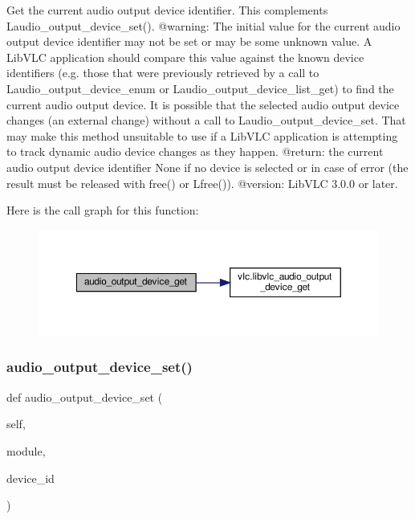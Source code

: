 \begin{DoxyVerb}Get the current audio output device identifier.
This complements L{audio_output_device_set}().
@warning: The initial value for the current audio output device identifier
may not be set or may be some unknown value. A LibVLC application should
compare this value against the known device identifiers (e.g. those that
were previously retrieved by a call to L{audio_output_device_enum} or
L{audio_output_device_list_get}) to find the current audio output device.
It is possible that the selected audio output device changes (an external
change) without a call to L{audio_output_device_set}. That may make this
method unsuitable to use if a LibVLC application is attempting to track
dynamic audio device changes as they happen.
@return: the current audio output device identifier None if no device is selected or in case of error (the result must be released with free() or L{free}()).
@version: LibVLC 3.0.0 or later.
\end{DoxyVerb}
 Here is the call graph for this function\+:
\nopagebreak
\begin{figure}[H]
\begin{center}
\leavevmode
\includegraphics[width=350pt]{classvlc_1_1_media_player_a8b9d8ed2e22b0f297547d50c9a484270_cgraph}
\end{center}
\end{figure}
\mbox{\label{classvlc_1_1_media_player_aa3acdfd10aed7948cf6d53a1d6f55660}} 
\subsubsection{\texorpdfstring{audio\+\_\+output\+\_\+device\+\_\+set()}{audio\_output\_device\_set()}}
{\footnotesize\ttfamily def audio\+\_\+output\+\_\+device\+\_\+set (\begin{DoxyParamCaption}\item[{}]{self,  }\item[{}]{module,  }\item[{}]{device\+\_\+id }\end{DoxyParamCaption})}

